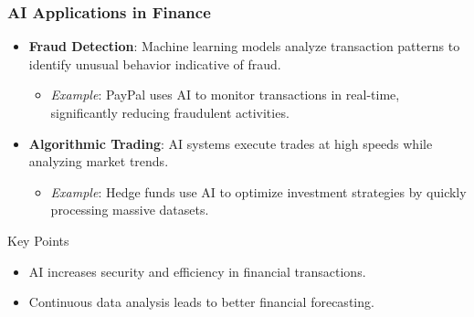 \documentclass[aspectratio=169]{beamer}
\begin{document}
\begin{frame}[fragile]
    \frametitle{AI Applications in Finance}
    \begin{itemize}
        \item \textbf{Fraud Detection}: Machine learning models analyze transaction patterns to identify unusual behavior indicative of fraud.
        \begin{itemize}
            \item \textit{Example}: PayPal uses AI to monitor transactions in real-time, significantly reducing fraudulent activities.
        \end{itemize}
        
        \item \textbf{Algorithmic Trading}: AI systems execute trades at high speeds while analyzing market trends.
        \begin{itemize}
            \item \textit{Example}: Hedge funds use AI to optimize investment strategies by quickly processing massive datasets.
        \end{itemize}
    \end{itemize}
    \begin{block}{Key Points}
        \begin{itemize}
            \item AI increases security and efficiency in financial transactions.
            \item Continuous data analysis leads to better financial forecasting.
        \end{itemize}
    \end{block}
\end{frame}
\end{document}
